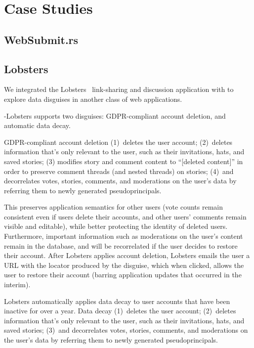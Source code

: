\section{Case Studies}

\subsection{WebSubmit.rs}

\subsection{Lobsters} 
We integrated the Lobsters~\cite{lobsters} link-sharing and discussion
application with \sys to explore data disguises in another class of web applications.

\sys-Lobsters supports two disguises: GDPR-compliant account deletion, and automatic data decay.

GDPR-compliant account deletion 
%
(1)~deletes the user account;
%
(2)~deletes information that's only relevant to the user, such as their invitations, hats, and saved
stories;
%
(3) modifies story and comment content to ``[deleted content]'' in order to preserve comment threads
(and nested threads) on stories;
%
(4)~and decorrelates votes, stories, comments, and moderations on the user's data by referring them
to newly generated pseudoprincipals.
%

This preserves application semantics for other users (\eg vote counts remain consistent even if
users delete their accounts, and other users' comments remain visible and editable), while better
protecting the identity of deleted users.  Furthermore, important information such as moderations on
the user's content remain in the database, and will be recorrelated if the user decides to restore
their account.  After Lobsters applies account deletion, Lobsters emails the user a URL with the
locator produced by the disguise, which when clicked, allows the user to restore their account
(barring application updates that occurred in the interim).

Lobsters automatically applies data decay to user accounts that have been inactive for over a year.
Data decay 
%
(1)~deletes the user account;
%
(2)~deletes information that's only relevant to the user, such as their invitations, hats, and saved
stories;
%
(3)~and decorrelates votes, stories, comments, and moderations on the user's data by referring them
to newly generated pseudoprincipals.
%

